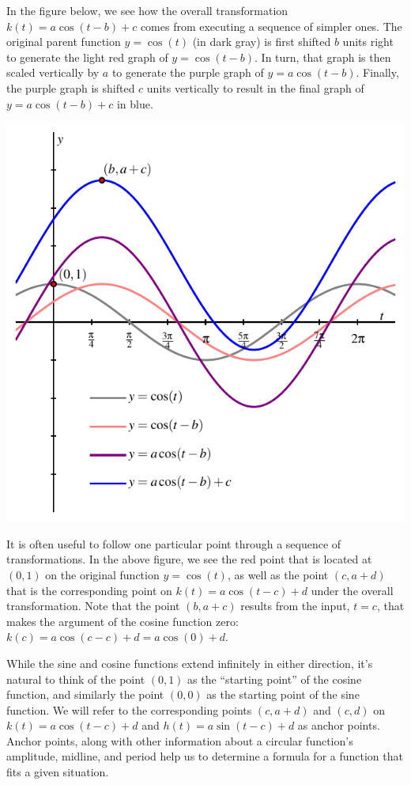 \documentclass{ximera}
\begin{document}
In the figure below, we see how the overall transformation \(k(t) = a\cos(t-b)+c\) comes from executing a sequence of simpler ones.  The original parent function \(y = \cos(t)\) (in dark gray) is first shifted \(b\) units right to generate the light red graph of \(y = \cos(t - b)\).  In turn, that graph is then scaled vertically by \(a\) to generate the purple graph of \(y = a\cos(t-b)\).  Finally, the purple graph is shifted \(c\) units vertically to result in the final graph of \(y = a\cos(t-b) + c\) in blue.%
\begin{image}
\includegraphics[width=0.8\linewidth]{images/sinusoidal-transformed-cosine}
\end{image}
It is often useful to follow one particular point through a sequence of transformations.  In the above figure, we see the red point that is located at \((0,1)\) on the original function \(y = \cos(t)\), as well as the point \((c, a+d)\) that is the corresponding point on \(k(t) = a\cos(t-c) + d\) under the overall transformation.  Note that the point \((b,a+c)\) results from the input, \(t = c\), that makes the argument of the cosine function zero:  \(k(c) = a\cos(c-c) + d = a\cos(0) + d\).%

While the sine and cosine functions extend infinitely in either direction, it's natural to think of the point \((0,1)\) as the ``starting point'' of the cosine function, and similarly the point \((0,0)\) as the starting point of the sine function.  We will refer to the corresponding points \((c,a+d)\) and \((c,d)\) on \(k(t) = a\cos(t-c) + d\) and \(h(t) = a\sin(t-c) + d\) as anchor points. Anchor points, along with other information about a circular function's amplitude, midline, and period help us to determine a formula for a function that fits a given situation.%
\end{document}
